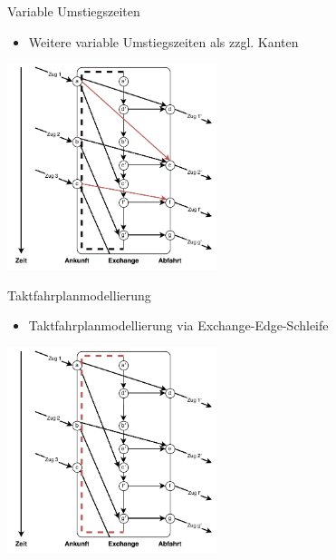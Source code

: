 \begin{frame}{Variable Umstiegszeiten}
	\begin{itemize}
		\item Weitere variable Umstiegszeiten als zzgl. Kanten
	\end{itemize}

	\begin{center}
		\includegraphics[height=6cm]{images/time_expanded_variable_interchange.pdf} 
	\end{center}
\end{frame}


\begin{frame}{Taktfahrplanmodellierung}
	\begin{itemize}
		\item Taktfahrplanmodellierung via Exchange-Edge-Schleife
	\end{itemize}

	\begin{center}
		\includegraphics[height=6cm]{images/time_expanded_constant_interchange_4.pdf} 
	\end{center}
\end{frame}


